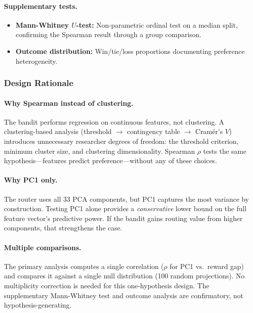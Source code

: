 \paragraph{Supplementary tests.}
\begin{itemize}[leftmargin=*,noitemsep,topsep=0pt]
    \item \textbf{Mann-Whitney $U$-test:} Non-parametric ordinal test on a median split, confirming the Spearman result through a group comparison.
    \item \textbf{Outcome distribution:} Win/tie/loss proportions documenting preference heterogeneity.
\end{itemize}

\subsubsection{Design Rationale}

\paragraph{Why Spearman instead of clustering.}
The bandit performs regression on continuous features, not clustering.
A clustering-based analysis (threshold $\to$ contingency table $\to$ Cram\'er's $V$) introduces unnecessary researcher degrees of freedom: the threshold criterion, minimum cluster size, and clustering dimensionality.
Spearman $\rho$ tests the same hypothesis---features predict preference---without any of these choices.

\paragraph{Why PC1 only.}
The router uses all 33 PCA components, but PC1 captures the most variance by construction.
Testing PC1 alone provides a \emph{conservative} lower bound on the full feature vector's predictive power.
If the bandit gains routing value from higher components, that strengthens the case.

\paragraph{Multiple comparisons.}
The primary analysis computes a single correlation ($\rho$ for PC1 vs.\ reward gap) and compares it against a single null distribution (100 random projections).
No multiplicity correction is needed for this one-hypothesis design.
The supplementary Mann-Whitney test and outcome analysis are confirmatory, not hypothesis-generating.

